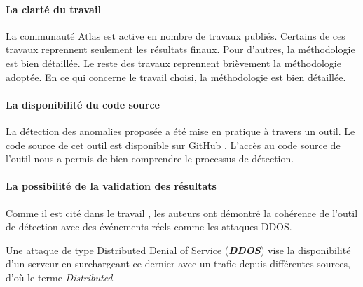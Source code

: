 \paragraph{La clarté du travail} La communauté  Atlas est active en nombre de travaux publiés.   Certains de ces travaux reprennent seulement les résultats finaux. Pour d'autres,  la méthodologie est bien détaillée. Le reste des travaux reprennent brièvement la méthodologie adoptée. En ce qui concerne le  travail choisi, la méthodologie est bien détaillée.

\paragraph{La disponibilité du code source} La détection des anomalies proposée a été mise en pratique à travers un outil. Le code source de cet outil est disponible sur GitHub \cite{InternetHealthReport}. L'accès au code source de l'outil nous a permis de bien comprendre le processus de détection.


\paragraph{La possibilité de la validation des résultats}  Comme il est cité dans le travail \cite{DBLP:journals/corr/FontugneAPB16}, les auteurs ont démontré la cohérence de l'outil de détection avec des événements réels comme les  attaques DDOS.
\begin{tcolorbox}
	Une attaque de type Distributed Denial of Service (\textbf{\textit{DDOS}}) vise la disponibilité d'un serveur en surchargeant ce dernier avec un trafic depuis différentes sources, d'où le terme \textit{Distributed}.
\end{tcolorbox}



